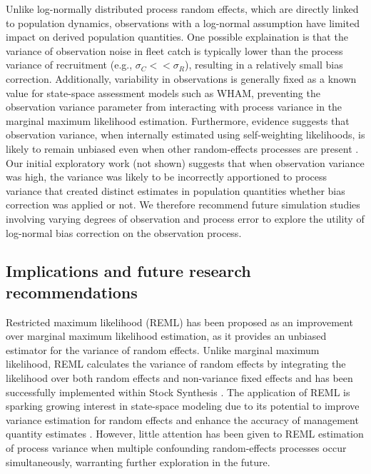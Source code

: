 \documentclass[
  12pt,
]{article}
\begin{document}
Unlike log-normally distributed process random effects, which are
directly linked to population dynamics, observations with a log-normal
assumption have limited impact on derived population quantities. One
possible explaination is that the variance of observation noise in fleet
catch is typically lower than the process variance of recruitment (e.g.,
\(\sigma_{C} << \sigma_{R}\)), resulting in a relatively small bias
correction. Additionally, variability in observations is generally fixed
as a known value for state-space assessment models such as WHAM,
preventing the observation variance parameter from interacting with
process variance in the marginal maximum likelihood estimation.
Furthermore, evidence suggests that observation variance, when
internally estimated using self-weighting likelihoods, is likely to
remain unbiased even when other random-effects processes are present
\citep{Fisch2023}. Our initial exploratory work (not shown) suggests
that when observation variance was high, the variance was likely to be
incorrectly apportioned to process variance that created distinct
estimates in population quantities whether bias correction was applied
or not. We therefore recommend future simulation studies involving
varying degrees of observation and process error to explore the utility
of log-normal bias correction on the observation process.

\subsection{Implications and future research
recommendations}\label{implications-and-future-research-recommendations}

Restricted maximum likelihood (REML) has been proposed as an improvement
over marginal maximum likelihood estimation, as it provides an unbiased
estimator for the variance of random effects. Unlike marginal maximum
likelihood, REML calculates the variance of random effects by
integrating the likelihood over both random effects and non-variance
fixed effects and has been successfully implemented within Stock
Synthesis \citep{Thorson2015}. The application of REML is sparking
growing interest in state-space modeling due to its potential to improve
variance estimation for random effects and enhance the accuracy of
management quantity estimates \citep{Maunder2019, Thorson2019}. However,
little attention has been given to REML estimation of process variance
when multiple confounding random-effects processes occur simultaneously,
warranting further exploration in the future.
\end{document}
